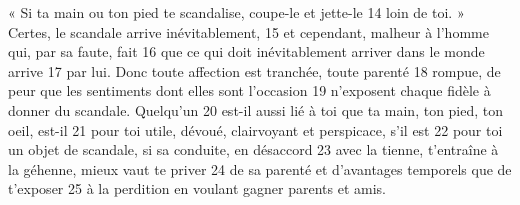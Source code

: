 « Si ta main ou ton pied te scandalise, coupe-le et jette-le	 
14	 	loin de toi. » Certes, le scandale arrive inévitablement,	 
15	 	et cependant, malheur à l'homme qui, par sa faute, fait	 
16	 	que ce qui doit inévitablement arriver dans le monde arrive	 
17	 	par lui. Donc toute affection est tranchée, toute parenté	 
18	 	rompue, de peur que les sentiments dont elles sont l'occasion	 
19	 	n'exposent chaque fidèle à donner du scandale. Quelqu'un	 
20	 	est-il aussi lié à toi que ta main, ton pied, ton oeil, est-il	 
21	 	pour toi utile, dévoué, clairvoyant et perspicace, s'il est	 
22	 	pour toi un objet de scandale, si sa conduite, en désaccord	 
23	 	avec la tienne, t'entraîne à la géhenne, mieux vaut te priver	 
24	 	de sa parenté et d'avantages temporels que de t'exposer	 
25	 	à la perdition en voulant gagner parents et amis.